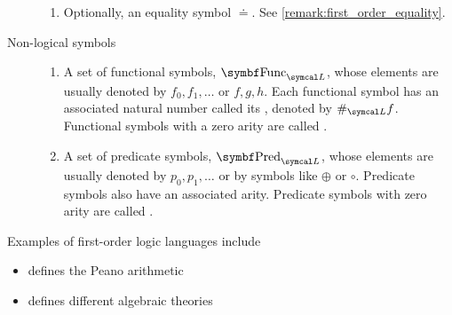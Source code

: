 \begin{definition}
\begin{description}
\begin{enumerate}
      \item Optionally, an equality symbol \( \doteq \). See \cref{remark:first_order_equality}.
    \end{enumerate}

    \item[Non-logical symbols]
    \mbox{}
    \begin{enumerate}
      \item A set of functional symbols, \( \Cat{Func}_{\Cal{L}} \), whose elements are usually denoted by \( f_0, f_1, \ldots \) or \( f, g, h \). Each functional symbol has an associated natural number called its , denoted by \( \#_{\Cal{L}} f \). Functional symbols with a zero arity are called .

      \item A set of predicate symbols, \( \Cat{Pred}_{\Cal{L}} \), whose elements are usually denoted by \( p_0, p_1, \ldots \) or by symbols like \( \oplus \) or \( \circ \). Predicate symbols also have an associated arity. Predicate symbols with zero arity are called .
    \end{enumerate}
  \end{description}
\end{definition}

\begin{example}\label{ex:first_order_languages}
  Examples of first-order logic languages include
  \begin{itemize}
    \item {} defines the Peano arithmetic
    \item {} defines different algebraic theories
  \end{itemize}
\end{example}

